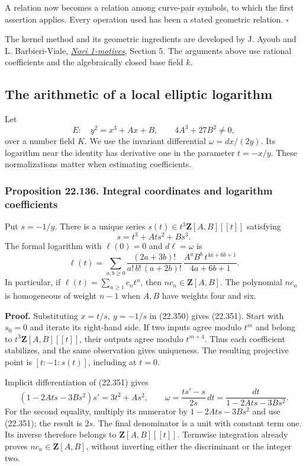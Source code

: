 \documentclass[
  11pt,
  a4paper,
]{article}
\begin{document}
A relation now becomes a relation among curve-pair symbols, to which the
first assertion applies. Every operation used has been a stated
geometric relation. \(\square\)

The kernel method and its geometric ingredients are developed by J.
Ayoub and L. Barbieri-Viale,
\href{https://arxiv.org/abs/1206.5923}{\emph{Nori 1-motives}}, Section
5. The arguments above use rational coefficients and the algebraically
closed base field \(k\).

\subsection{The arithmetic of a local elliptic
logarithm}\label{the-arithmetic-of-a-local-elliptic-logarithm}

Let \[
 E:\quad y^2=x^3+Ax+B,\qquad 4A^3+27B^2\ne0,
 \tag{22.350}
\] over a number field \(K\). We use the invariant differential
\(\omega=dx/(2y)\). Its logarithm near the identity has derivative one
in the parameter \(t=-x/y\). These normalizations matter when estimating
coefficients.

\subsubsection{Proposition 22.136. Integral coordinates and logarithm
coefficients}\label{proposition-22.136.-integral-coordinates-and-logarithm-coefficients}

Put \(s=-1/y\). There is a unique series
\(s(t)\in t^3\mathbf Z[A,B][[t]]\) satisfying \[
 s=t^3+Ats^2+Bs^3.
 \tag{22.351}
\] The formal logarithm with \(\ell(0)=0\) and \(d\ell=\omega\) is \[
 \ell(t)=
 \sum_{a,b\ge0}
 \frac{(2a+3b)!}{a!\,b!\,(a+2b)!}\,
 \frac{A^aB^b\,t^{4a+6b+1}}{4a+6b+1}.
 \tag{22.352}
\] In particular, if \(\ell(t)=\sum_{n\ge1}c_nt^n\), then
\(nc_n\in\mathbf Z[A,B]\). The polynomial \(nc_n\) is homogeneous of
weight \(n-1\) when \(A,B\) have weights four and six.

\textbf{Proof.} Substituting \(x=t/s,\ y=-1/s\) in (22.350) gives
(22.351). Start with \(s_0=0\) and iterate its right-hand side. If two
inputs agree modulo \(t^m\) and belong to \(t^3\mathbf Z[A,B][[t]]\),
their outputs agree modulo \(t^{m+4}\). Thus each coefficient
stabilizes, and the same observation gives uniqueness. The resulting
projective point is \([t:-1:s(t)]\), including at \(t=0\).

Implicit differentiation of (22.351) gives \[
 (1-2Ats-3Bs^2)s'=3t^2+As^2,\qquad
 \omega=\frac{t s'-s}{2s}\,dt
        =\frac{dt}{1-2Ats-3Bs^2}.
 \tag{22.353}
\] For the second equality, multiply its numerator by \(1-2Ats-3Bs^2\)
and use (22.351); the result is \(2s\). The final denominator is a unit
with constant term one. Its inverse therefore belongs to
\(\mathbf Z[A,B][[t]]\). Termwise integration already proves
\(nc_n\in\mathbf Z[A,B]\), without inverting either the discriminant or
the integer two.
\end{document}
